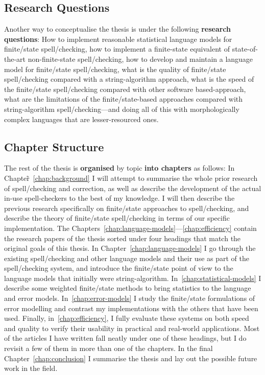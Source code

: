\documentclass[officiallayout]{unihelcompling}
\begin{document}
\subsection{Research Questions}
\label{subsec:questions}

Another way to conceptualise the thesis is under the following \textbf{research
questions}: How to implement reasonable statistical language models for
finite\-/state spell\-/checking, how to implement a finite-state equivalent of
state-of-the-art non-finite-state spell\-/checking, how to develop and maintain
a language model for finite\-/state spell\-/checking, what is the quality of
finite\-/state spell\-/checking compared with a string-algorithm approach, what
is the speed of the finite\-/state spell\-/checking compared with other
software based-approach, what are the limitations of the finite\-/state-based
approaches compared with string-algorithm spell\-/checking---and doing all of
this with morphologically complex languages that are lesser-resourced ones.

\subsection{Chapter Structure}

The rest of the thesis is \textbf{organised} by topic \textbf{into chapters} as
follows: In Chapter̃~\ref{chap:background} I will attempt to summarise the whole
prior research of spell\-/checking and correction, as well as describe the
development of the actual in-use spell-checkers to the best of my knowledge. I
will then describe the previous research specifically on finite\-/state
approaches to spell\-/checking, and describe the theory of finite\-/state
spell\-/checking in terms of our specific implementation. The
Chapters~\ref{chap:language-models}---\ref{chap:efficiency} contain the
research papers of the thesis sorted under four headings that match the
original goals of this thesis.  In Chapter~\ref{chap:language-models} I go
through the existing spell\-/checking and other language models and their use
as part of the spell\-/checking system, and introduce the finite\-/state point
of view to the language models that initially were string-algorithm.
In~\ref{chap:statistical-models} I describe some weighted finite\-/state
methods to bring statistics to the language and error models.
In~\ref{chap:error-models} I study the finite\-/state formulations of error
modelling and contrast my implementations with the others that have been used.
Finally, in~\ref{chap:efficiency}, I fully evaluate these systems on both speed
and quality to verify their usability in practical and real-world applications.
Most of the articles I have written fall neatly under one of these headings,
but I do revisit a few of them in more than one of the chapters. In the final
Chapter~\ref{chap:conclusion} I summarise the thesis and lay out the possible
future work in the field.
\end{document}

